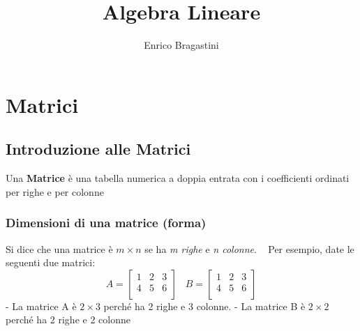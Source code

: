 \documentclass[11pt,oneside]{book}
\title{\Large{\textbf{Algebra Lineare}}}
\author{Enrico Bragastini}
\begin{document}
\pagestyle{fancy}
\fancyhf{}
\rhead{}
\lhead{\nouppercase\leftmark}
\cfoot{\thepage}
\frontmatter

\maketitle
\tableofcontents

\mainmatter
\chapter{Matrici}

\section{Introduzione alle Matrici}
Una \textbf{Matrice} è una tabella numerica a doppia entrata con i coefficienti ordinati per righe
e per colonne

\subsection{Dimensioni di una matrice (forma)}
Si dice che una matrice è $m \times n$ se ha \emph{m righe} e \emph{n colonne}.
~\newline
Per esempio, date le seguenti due matrici:
\begin{equation*}
    A =
    \begin{bmatrix}
        1 & 2 & 3 \\
        4 & 5 & 6 \\
    \end{bmatrix}
    \; \; \; B =
    \begin{bmatrix}
        1 & 2 & 3 \\
        4 & 5 & 6 \\
    \end{bmatrix}
\end{equation*}
- La matrice A è $2 \times 3$ perché ha 2 righe e 3 colonne. \newline
- La matrice B è $2 \times 2$ perché ha 2 righe e 2 colonne
\end{document}
